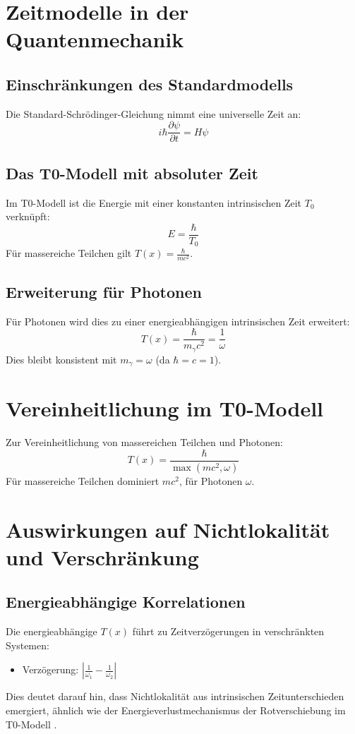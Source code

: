 \documentclass[12pt,a4paper]{article}
\newcommand{\Tfield}{T(x)}
\begin{document}
	\section{Zeitmodelle in der Quantenmechanik}
	\subsection{Einschränkungen des Standardmodells}
	Die Standard-Schrödinger-Gleichung nimmt eine universelle Zeit an:
	\begin{equation}
		i\hbar\frac{\partial\psi}{\partial t} = H\psi
	\end{equation}
	
	\subsection{Das T0-Modell mit absoluter Zeit}
	Im T0-Modell ist die Energie mit einer konstanten intrinsischen Zeit \(T_0\) verknüpft:
	\begin{equation}
		E = \frac{\hbar}{T_0}
	\end{equation}
	Für massereiche Teilchen gilt \(\Tfield = \frac{\hbar}{m c^2}\).
	
	\subsection{Erweiterung für Photonen}
	Für Photonen wird dies zu einer energieabhängigen intrinsischen Zeit erweitert:
	\begin{equation}
		\Tfield = \frac{\hbar}{m_\gamma c^2} = \frac{1}{\omega}
	\end{equation}
	Dies bleibt konsistent mit \(m_\gamma = \omega\) (da \(\hbar = c = 1\)).
	
	\section{Vereinheitlichung im T0-Modell}
	Zur Vereinheitlichung von massereichen Teilchen und Photonen:
	\begin{equation}
		\Tfield = \frac{\hbar}{\max(m c^2, \omega)}
	\end{equation}
	Für massereiche Teilchen dominiert \(m c^2\), für Photonen \(\omega\).
	
	\section{Auswirkungen auf Nichtlokalität und Verschränkung}
	\subsection{Energieabhängige Korrelationen}
	Die energieabhängige \(\Tfield\) führt zu Zeitverzögerungen in verschränkten Systemen:
	\begin{itemize}
		\item Verzögerung: \(\left|\frac{1}{\omega_1} - \frac{1}{\omega_2}\right|\)
	\end{itemize}
	Dies deutet darauf hin, dass Nichtlokalität aus intrinsischen Zeitunterschieden emergiert, ähnlich wie der Energieverlustmechanismus der Rotverschiebung im T0-Modell \cite{pascher_messdifferenzen_2025}.
	
\end{document}
